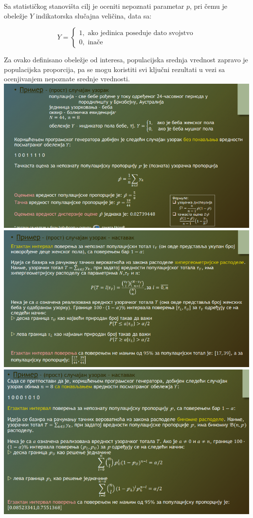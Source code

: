 \documentclass[10pt,a4paper,]{article}
\begin{document}
Sa statističkog stanovišta cilj je oceniti nepoznati parametar $p$, pri čemu je obeležje
$Y$ indikatorska slučajna veličina, data sa:

\begin{equation}
Y = 
\begin{cases}
1, \text{ ako jedinica poseduje dato svojstvo} \\
0, \text{ inače}
\end{cases}
\end{equation}

Za ovako definisano obeležje od interesa, populacijska srednja vrednost zapravo je 
populacijska proporcija, pa se mogu koristiti svi ključni rezultati u vezi sa ocenjivanjem 
nepoznate srednje vrednosti.
\\[0.2cm]

\includegraphics[scale=0.35]{nedelja_4_4.png}\\
\includegraphics[scale=0.4]{nedelja_4_5.png}\\
\includegraphics[scale=0.4]{nedelja_4_6.png}\\
\end{document}
